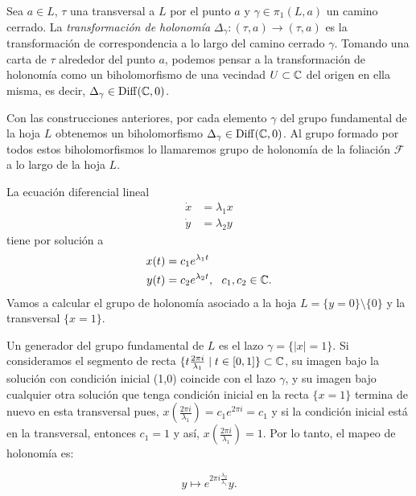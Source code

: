 \begin{defn}
Sea $a\in L$, $\tau$ una transversal a $L$ por el punto $a$ y $\gamma\in\pi_{1}(L,a)$ un camino cerrado. La \emph{transformación de holonomía} $\Delta_{\gamma}\colon (\tau,a)\rightarrow(\tau,a)$ es la transformación de correspondencia a lo largo del camino cerrado $\gamma$. Tomando una carta de $\tau$ alrededor del punto $a$, podemos pensar a la transformación de holonomía como un biholomorfismo de una vecindad $U\subset\mathbb{C}$ del origen en ella misma, es decir, $\Delta_{\gamma}\in \mathrm{Diff}(\mathbb{C},0)$.
\end{defn} 

Con las construcciones anteriores, por cada elemento $\gamma$ del grupo fundamental de la hoja $L$ obtenemos un biholomorfismo $\Delta_{\gamma}\in\mathrm{Diff}(\mathbb{C},0)$. Al grupo formado por todos estos biholomorfismos lo llamaremos grupo de holonomía de la foliación $\mathcal{F}$ a lo largo de la hoja $L$.

\begin{Ejemplo}
\label{Ej:HolonomiaLineal}
La ecuación diferencial lineal
\begin{equation}
\begin{aligned}
\dot{x} &= \lambda_{1}x\\
\dot{y} &= \lambda_{2}y
\end{aligned}
\end{equation}
tiene por solución a 
\begin{equation}
\begin{aligned}
x(t) &= c_{1}e^{\lambda_{1}t}\\
y(t) &= c_{2}e^{\lambda_{2}t},\ \  c_{1},c_{2}\in\mathbb{C}.
\end{aligned}
\end{equation}
Vamos a calcular el grupo de holonomía asociado a la hoja $L=\{y=0\}\setminus\{0\}$ y la transversal $\{x=1\}$.

Un generador del grupo fundamental de $L$ es el lazo $\gamma=\{\left|x\right| = 1\}$. Si consideramos el segmento de recta $\{t\tfrac{2\pi i}{\lambda_{1}} \mid t\in[0,1]\}\subset\mathbb{C}$, su imagen bajo la solución con condición inicial (1,0) coincide con el lazo $\gamma$, y su imagen bajo cualquier otra solución que tenga condición inicial en la recta $\{x=1\}$ termina de nuevo en esta transversal pues, $x(\tfrac{2\pi i}{\lambda_{1}})=c_{1}e^{2\pi i}=c_{1}$ y si la condición inicial está en la transversal, entonces $c_{1}=1$ y así, $x(\tfrac{2\pi i}{\lambda_{1}})=1$. Por lo tanto, el mapeo de holonomía es: 

\begin{equation}
y \mapsto e^{2\pi i \frac{\lambda_{2}}{\lambda_{1}}}y.
\end{equation}   
\end{Ejemplo}

